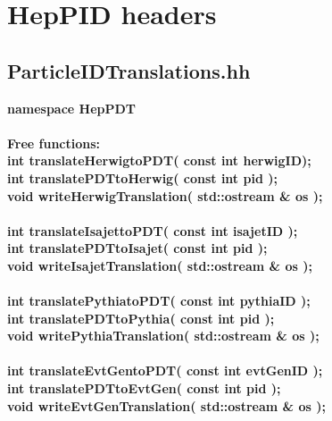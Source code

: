 \section {HepPID headers}
\label{PIDheaders}

\subsection {ParticleIDTranslations.hh}

\begin{tabbing}

{\bf namespace HepPDT} \\  \\

{\bf Free functions:} \\
\hspace{0.5in} {\bf int translateHerwigtoPDT( const int herwigID);} \\
\hspace{0.5in} {\bf int translatePDTtoHerwig( const int pid );} \\ 
\hspace{0.5in} {\bf void  writeHerwigTranslation( std::ostream \& os );} \\  \\

\hspace{0.5in} {\bf int translateIsajettoPDT( const int isajetID );} \\
\hspace{0.5in} {\bf int translatePDTtoIsajet( const int pid );} \\ 
\hspace{0.5in} {\bf void  writeIsajetTranslation( std::ostream \& os );} \\  \\

\hspace{0.5in} {\bf int translatePythiatoPDT( const int pythiaID );} \\
\hspace{0.5in} {\bf int translatePDTtoPythia( const int pid );} \\ 
\hspace{0.5in} {\bf void  writePythiaTranslation( std::ostream \& os );} \\  \\

\hspace{0.5in} {\bf int translateEvtGentoPDT( const int evtGenID );} \\
\hspace{0.5in} {\bf int translatePDTtoEvtGen( const int pid );} \\
\hspace{0.5in} {\bf void  writeEvtGenTranslation( std::ostream \& os );} \\  \\


\end{tabbing}
